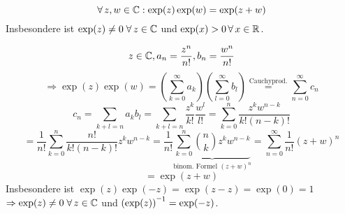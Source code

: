 \documentclass[../ana1.tex]{subfiles}
\begin{document}
\begin{satz}[Additionstheorem]
    \[ \forall \, z,w\in\mathbb{C} : \exp(z) \exp(w) = \exp(z+w) \]
    Insbesondere ist \( \exp(z) \neq 0 \;\forall \, z\in\mathbb{C} \) und \( \exp(x)>0 \,\forall \, x\in\mathbb{R} \).
\end{satz}
\begin{bew}
    \[ z\in\mathbb{C}, a_n = \frac{ z^n }{ n! }, b_n = \frac{ w^n }{ n! } \]
    \[ \Rightarrow \exp(z)\exp(w) = \left( \sum_{k=0}^\infty a_k \right) \left( \sum_{l=0}^\infty b_l \right) \overset{\text{Cauchyprod.}}{=} \sum_{n=0}^\infty c_n \]
    \[ c_n = \sum_{k+l=n} a_k b_l = \sum_{k+l=n} \frac{z^k}{k!} \frac{w^l}{l!} = \sum_{k=0}^n \frac{ z^k w^{n-k} }{ k!(n-k)! } \]
    \[ = \frac{1}{n!} \sum_{k=0}^n \frac{ n! }{ k!(n-k)! } z^k w^{n-k} = \frac{1}{n!} \underbrace{ \sum_{k=0}^n \binom{n}{k} z^k w^{n-k} }_{\text{binom. Formel } {(z+w)}^n} = \sum_{n=0}^\infty \frac{1}{n!} {(z+w)}^n \]
    \[ = \exp(z+w) \]
    Insbesondere ist \( \exp(z) \exp(-z) = \exp(z-z) = \exp(0) = 1 \) \\
    \( \Rightarrow \exp(z) \neq 0 \;\forall \, z\in\mathbb{C} \) und \( \inverse{(\exp(z))} = \exp(-z) \).
\end{bew}
\end{document}
